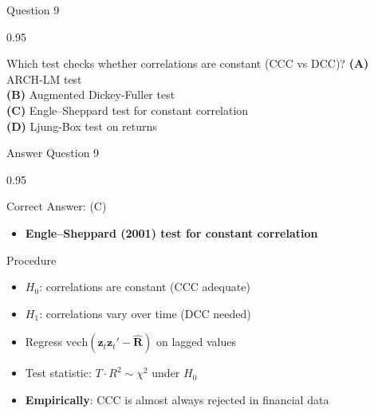 \documentclass[9pt, aspectratio=169, t]{beamer}
\begin{document}
\begin{frame}{Question 9}
    \begin{cminipage}{0.95\textwidth}
    \begin{block}{Which test checks whether correlations are constant (CCC vs DCC)?}
        \textcolor{MainBlue}{\textbf{(A)}} ARCH-LM test\\[3pt]
        \textcolor{MainBlue}{\textbf{(B)}} Augmented Dickey-Fuller test\\[3pt]
        \textcolor{MainBlue}{\textbf{(C)}} Engle--Sheppard test for constant correlation\\[3pt]
        \textcolor{MainBlue}{\textbf{(D)}} Ljung-Box test on returns
    \end{block}
    \end{cminipage}
\end{frame}

\begin{frame}{Answer Question 9}
    \begin{cminipage}{0.95\textwidth}
    \begin{exampleblock}{Correct Answer: (C)}
        \begin{itemize}\setlength{\itemsep}{0pt}
            \item \textbf{Engle--Sheppard (2001) test for constant correlation}
        \end{itemize}
    \end{exampleblock}

    \pause
    \begin{block}{Procedure}
        \begin{itemize}\setlength{\itemsep}{0pt}
            \item $H_0$: correlations are constant (CCC adequate)
            \item $H_1$: correlations vary over time (DCC needed)
            \item Regress $\text{vech}(\mathbf{z}_t\mathbf{z}_t' - \hat{\mathbf{R}})$ on lagged values
            \item Test statistic: $T \cdot R^2 \sim \chi^2$ under $H_0$
            \item \textbf{Empirically}: CCC is almost always rejected in financial data
        \end{itemize}
    \end{block}
    \end{cminipage}
\end{frame}
\end{document}
